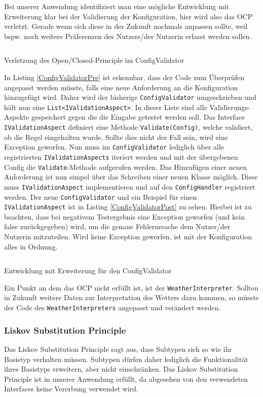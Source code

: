Bei unserer Anwendung identifiziert man eine mögliche Entwicklung mit Erweiterung klar bei der Validierung der Konfiguration, hier wird also das OCP verletzt. Gerade wenn sich diese in der Zukunft nochmals anpassen sollte, weil bspw. noch weitere Präferenzen des Nutzers/der Nutzerin erfasst werden sollen.
\begin{listing}[h]
\inputminted[linenos=true,frame=lines]{csharp}{Listings/ValidateInputsPre.cs}
\caption{Verletzung des Open/Closed-Principle im ConfigValidator}
\label{ConfigValidatorPre}
\end{listing}
In Listing \ref{ConfigValidatorPre} ist erkennbar, dass der Code zum Überprüfen angepasst werden müsste, falls eine neue Anforderung an die Konfiguration hinzugefügt wird. Daher wird der bisherige \texttt{ConfigValidator} umgeschrieben und hält nun eine \texttt{List<IValidationAspect>}. In dieser Liste sind alle Validierungs-Aspekte gespeichert gegen die die Eingabe getestet werden soll. Das Interface \texttt{IValidationAspect} definiert eine Methode \texttt{Validate(Config)}, welche validiert, ob die Regel eingehalten wurde. Sollte dies nicht der Fall sein, wird eine Exception geworfen. Nun muss im \texttt{ConfigValidator} lediglich über alle registrierten \texttt{IValidationAspects} iteriert werden und mit der übergebenen Config die \texttt{Validate}-Methode aufgerufen werden. Das Hinzufügen einer neuen Anforderung ist nun simpel über das Schreiben einer neuen Klasse möglich. Diese muss \texttt{IValidationAspect} implementieren und auf den \texttt{ConfigHandler} registriert werden. Der neue \texttt{ConfigValidator} und ein Beispiel für einen \texttt{IValidationAspect} ist in Listing \ref{ConfigValidatorPost} zu sehen. Hierbei ist zu beachten, dass bei negativem Testergebnis eine Exception geworfen (und kein false zurückgegeben) wird, um die genaue Fehlerursache dem Nutzer/der Nutzerin mitzuteilen. Wird keine Exception geworfen, ist mit der Konfiguration alles in Ordnung.

\begin{listing}[h]
\inputminted[linenos=true,frame=lines]{csharp}{Listings/ValidateInputsPost.cs}
\caption{Entwicklung mit Erweiterung für den ConfigValidator}
\label{ConfigValidatorPost}
\end{listing}

Ein Punkt an dem das OCP nicht erfüllt ist, ist der \texttt{WeatherInterpreter}. Sollten in Zukunft weitere Daten zur Interpretation des Wetters dazu kommen, so müsste der Code des \texttt{WeatherInterpreters} angepasst und verändert werden.
\subsubsection{Liskov Substitution Principle}
Das Liskov Substitution Principle sagt aus, dass Subtypen sich so wie ihr Basistyp verhalten müssen. Subtypen dürfen daher lediglich die Funktionalität ihres Basistyps erweitern, aber nicht einschränken.
Das Liskov Substitution Principle ist in unserer Anwendung erfüllt, da abgesehen von den verwendeten Interfaces keine Vererbung verwendet wird.
